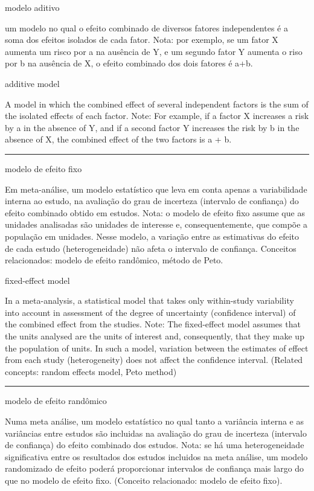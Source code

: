 \documentclass[
  openany]{book}
\begin{document}
modelo aditivo

um modelo no qual o efeito combinado de diversos fatores independentes é a soma dos efeitos isolados de cada fator. Nota: por exemplo, se um fator X aumenta um risco por a na ausência de Y, e um segundo fator Y aumenta o riso por b na ausência de X, o efeito combinado dos dois fatores é a+b.

additive model

A model in which the combined effect of several independent factors is the sum of the isolated effects of each factor. Note: For example, if a factor X increases a risk by a in the absence of Y, and if a second factor Y increases the risk by b in the absence of X, the combined effect of the two factors is a + b.

\begin{center}\rule{0.5\linewidth}{0.5pt}\end{center}

modelo de efeito fixo

Em meta-análise, um modelo estatístico que leva em conta apenas a variabilidade interna ao estudo, na avaliação do grau de incerteza (intervalo de confiança) do efeito combinado obtido em estudos. Nota: o modelo de efeito fixo assume que as unidades analisadas são unidades de interesse e, consequentemente, que compõe a população em unidades. Nesse modelo, a variação entre as estimativas do efeito de cada estudo (heterogeneidade) não afeta o intervalo de confiança. Conceitos relacionados: modelo de efeito randômico, método de Peto.

fixed-effect model

In a meta-analysis, a statistical model that takes only within-study variability into account in assessment of the degree of uncertainty (confidence interval) of the combined effect from the studies. Note: The fixed-effect model assumes that the units analysed are the units of interest and, consequently, that they make up the population of units. In such a model, variation between the estimates of effect from each study (heterogeneity) does not affect the confidence interval. (Related concepts: random effects model, Peto method)

\begin{center}\rule{0.5\linewidth}{0.5pt}\end{center}

modelo de efeito randômico

Numa meta análise, um modelo estatístico no qual tanto a variância interna e as variâncias entre estudos são incluidas na avaliação do grau de incerteza (intervalo de confiança) do efeito combinado dos estudos. Nota: se há uma heterogeneidade significativa entre os resultados dos estudos incluidos na meta análise, um modelo randomizado de efeito poderá proporcionar intervalos de confiança mais largo do que no modelo de efeito fixo. (Conceito relacionado: modelo de efeito fixo).
\end{document}
